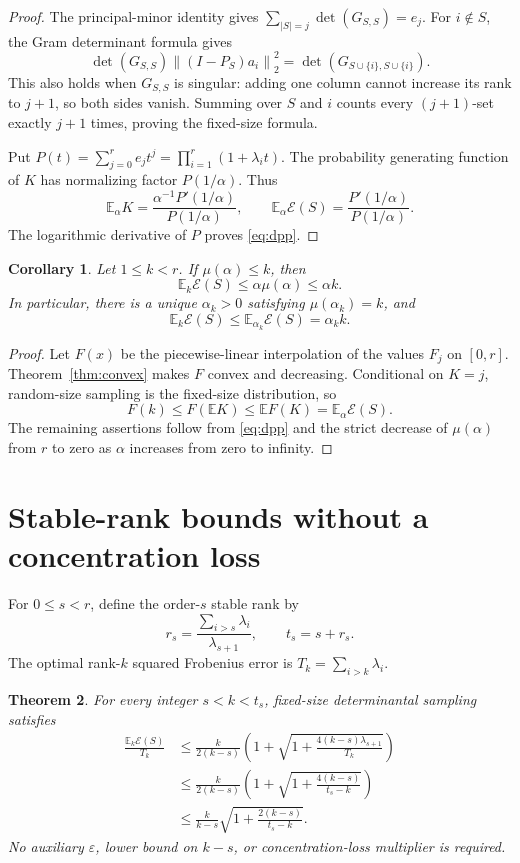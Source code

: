 \documentclass[11pt]{article}
\newtheorem{theorem}{Theorem}[section]
\newtheorem{corollary}[theorem]{Corollary}
\theoremstyle{definition}
\newcommand{\E}{\mathbb E}
\newcommand{\norm}[1]{\left\lVert#1\right\rVert}
\newcommand{\eps}{\varepsilon}
\begin{document}
\begin{proof}
The principal-minor identity gives
$\sum_{|S|=j}\det(G_{S,S})=e_j$.
For $i\notin S$, the Gram determinant formula gives
\[
 \det(G_{S,S})\norm{(I-P_S)a_i}_2^2
       =\det(G_{S\cup\{i\},S\cup\{i\}}).
\]
This also holds when $G_{S,S}$ is singular: adding one column cannot increase its rank to $j+1$, so both sides vanish. Summing over $S$ and $i$ counts every $(j+1)$-set exactly $j+1$ times, proving the fixed-size formula.

Put $P(t)=\sum_{j=0}^r e_jt^j=\prod_{i=1}^r(1+\lambda_i t)$. The probability generating function of $K$ has normalizing factor $P(1/\alpha)$. Thus
\[
 \E_\alpha K=\frac{\alpha^{-1}P'(1/\alpha)}{P(1/\alpha)},\qquad
 \E_\alpha\mathcal E(S)=\frac{P'(1/\alpha)}{P(1/\alpha)}.
\]
The logarithmic derivative of $P$ proves \eqref{eq:dpp}.
\end{proof}

\begin{corollary}\label{cor:jensen}
Let $1\le k<r$. If $\mu(\alpha)\le k$, then
\[
 \E_k\mathcal E(S)\le\alpha\mu(\alpha)\le\alpha k.
\]
In particular, there is a unique $\alpha_k>0$ satisfying $\mu(\alpha_k)=k$, and
\[
 \E_k\mathcal E(S)\le\E_{\alpha_k}\mathcal E(S)=\alpha_k k.
\]
\end{corollary}

\begin{proof}
Let $F(x)$ be the piecewise-linear interpolation of the values $F_j$ on $[0,r]$. Theorem~\ref{thm:convex} makes $F$ convex and decreasing. Conditional on $K=j$, random-size sampling is the fixed-size distribution, so
\[
 F(k)\le F(\E K)\le\E F(K)=\E_\alpha\mathcal E(S).
\]
The remaining assertions follow from \eqref{eq:dpp} and the strict decrease of $\mu(\alpha)$ from $r$ to zero as $\alpha$ increases from zero to infinity.
\end{proof}

\section{Stable-rank bounds without a concentration loss}
For $0\le s<r$, define the order-$s$ stable rank by
\[
 r_s=\frac{\sum_{i>s}\lambda_i}{\lambda_{s+1}},\qquad t_s=s+r_s.
\]
The optimal rank-$k$ squared Frobenius error is
$T_k=\sum_{i>k}\lambda_i$.

\begin{theorem}\label{thm:stable}
For every integer $s<k<t_s$, fixed-size determinantal sampling satisfies
\begin{align}
 \frac{\E_k\mathcal E(S)}{T_k}
 &\le \frac{k}{2(k-s)}
      \left(1+\sqrt{1+\frac{4(k-s)\lambda_{s+1}}{T_k}}\right)\label{eq:directbound}\\
 &\le \frac{k}{2(k-s)}
      \left(1+\sqrt{1+\frac{4(k-s)}{t_s-k}}\right)\label{eq:stablebound}\\
 &\le \frac{k}{k-s}\sqrt{1+\frac{2(k-s)}{t_s-k}}.\label{eq:oldphi}
\end{align}
No auxiliary $\eps$, lower bound on $k-s$, or concentration-loss multiplier is required.
\end{theorem}
\end{document}
